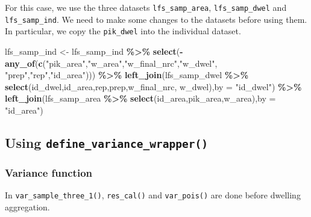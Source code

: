 \documentclass[
]{article}
\newenvironment{Shaded}{\begin{snugshade}}{\end{snugshade}}
\newcommand{\AttributeTok}[1]{\textcolor[rgb]{0.13,0.29,0.53}{#1}}
\newcommand{\FunctionTok}[1]{\textcolor[rgb]{0.13,0.29,0.53}{\textbf{#1}}}
\newcommand{\NormalTok}[1]{#1}
\newcommand{\OtherTok}[1]{\textcolor[rgb]{0.56,0.35,0.01}{#1}}
\newcommand{\SpecialCharTok}[1]{\textcolor[rgb]{0.81,0.36,0.00}{\textbf{#1}}}
\newcommand{\StringTok}[1]{\textcolor[rgb]{0.31,0.60,0.02}{#1}}
\begin{document}
For this case, we use the three datasets \texttt{lfs\_samp\_area},
\texttt{lfs\_samp\_dwel} and \texttt{lfs\_samp\_ind}. We need to make
some changes to the datasets before using them. In particular, we copy
the \texttt{pik\_dwel} into the individual dataset.

\begin{Shaded}
\begin{Highlighting}[]
\NormalTok{lfs\_samp\_ind }\OtherTok{\textless{}{-}}\NormalTok{ lfs\_samp\_ind }\SpecialCharTok{\%\textgreater{}\%} 
  \FunctionTok{select}\NormalTok{(}\SpecialCharTok{{-}}\FunctionTok{any\_of}\NormalTok{(}\FunctionTok{c}\NormalTok{(}\StringTok{"pik\_area"}\NormalTok{,}\StringTok{"w\_area"}\NormalTok{,}\StringTok{"w\_final\_nrc"}\NormalTok{,}\StringTok{"w\_dwel"}\NormalTok{,}
                   \StringTok{"prep"}\NormalTok{,}\StringTok{"rep"}\NormalTok{,}\StringTok{"id\_area"}\NormalTok{))) }\SpecialCharTok{\%\textgreater{}\%} 
  \FunctionTok{left\_join}\NormalTok{(lfs\_samp\_dwel }\SpecialCharTok{\%\textgreater{}\%} 
              \FunctionTok{select}\NormalTok{(id\_dwel,id\_area,rep,prep,w\_final\_nrc,}
\NormalTok{                     w\_dwel),}\AttributeTok{by =} \StringTok{"id\_dwel"}\NormalTok{) }\SpecialCharTok{\%\textgreater{}\%} 
  \FunctionTok{left\_join}\NormalTok{(lfs\_samp\_area }\SpecialCharTok{\%\textgreater{}\%} 
              \FunctionTok{select}\NormalTok{(id\_area,pik\_area,w\_area),}\AttributeTok{by =} \StringTok{"id\_area"}\NormalTok{)}
\end{Highlighting}
\end{Shaded}

\subsection{\texorpdfstring{Using
\texttt{define\_variance\_wrapper()}}{Using define\_variance\_wrapper()}}\label{using-define_variance_wrapper-4}

\subsubsection{Variance function}\label{variance-function-4}

In \texttt{var\_sample\_three\_1()}, \texttt{res\_cal()} and
\texttt{var\_pois()} are done before dwelling aggregation.
\end{document}
